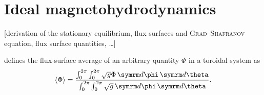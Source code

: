 \section{Ideal magnetohydrodynamics}

[derivation of the stationary equilibrium, flux surfaces and \textsc{Grad}--\textsc{Shafranov} equation, flux surface quantities, \ldots]

\textcite{dHaeseleer91} defines the flux-surface average of an arbitrary quantity $\Phi$ in a toroidal system as
\begin{gather}
  \langle \Phi \rangle = \frac{\int_{0}^{2 \pi} \int_{0}^{2 \pi} \sqrt{g} \Phi \, \diff \phi \, \diff \theta}{\int_{0}^{2 \pi} \int_{0}^{2 \pi} \sqrt{g} \, \diff \phi \, \diff \theta}. \label{eq:flux_surface_avg}
\end{gather}

